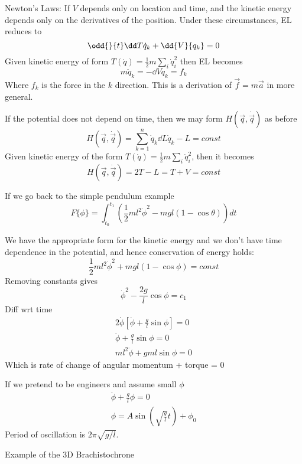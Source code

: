 \documentclass{E:/Documents/Latex/myassignment}
\begin{document}
Newton's Laws:
If $V$ depends only on location and time, and the kinetic energy depends only on the derivatives of the position. Under these circumstances, EL reduces to
\[\odd{}{t} \dd T{\dot q_k} + \dd{V}{q_k} = 0\]
Given kinetic energy of form $T(\dot q) = \frac12 m \sum_i \dot q_i^2$ then EL becomes
\[m\ddot q_k = -\dd V{q_k} = f_k\]
Where $f_k$ is the force in the $k$ direction.
This is a derivation of $\vec f = m \vec a$ in more general.

If the potential does not depend on time, then we may form $H(\vec q,\dot{\vec q})$ as before
\[H(\vec q,\dot{\vec q}) = \sum_{k=1}^n \dot q_k \dd L{\dot q_k} - L = const\]
Given kinetic energy of the form $T(\dot q) = \frac12 m \sum_i \dot q_i^2$, then it becomes
\[H(\vec q,\dot{\vec q}) = 2T - L = T+V = const\]

If we go back to the simple pendulum example
\[F\{\phi\} = \int_{t_0}^{t_1} \left(\frac12 ml^2 \dot\phi^2 - mgl (1-\cos\theta)\right) dt\]

We have the appropriate form for the kinetic energy and we don't have time dependence in the potential, and hence conservation of energy holds:
\[\frac12 ml^2 \dot\phi^2 + mgl(1-\cos\phi) = const\]
Removing constants gives
\[\dot\phi^2 - \frac{2g}{l} \cos\phi = c_1\]
Diff wrt time
\begin{align*}
	2 \dot \phi [\ddot \phi + \frac gl \sin\phi] = 0\\
	\ddot\phi + \frac gl \sin\phi =0 \\
	ml^2 \ddot \phi + gml \sin\phi = 0	
\end{align*}
Which is rate of change of angular momentum + torque = 0

If we pretend to be engineers and assume small $\phi$
\begin{align*}
	\ddot \phi + \frac gl \phi = 0\\
	\phi = A\sin(\sqrt{\frac gl}t ) + \phi_0 
\end{align*}
Period of oscillation is $2\pi \sqrt{g/l}$.


Example of the 3D Brachistochrone
\end{document}
